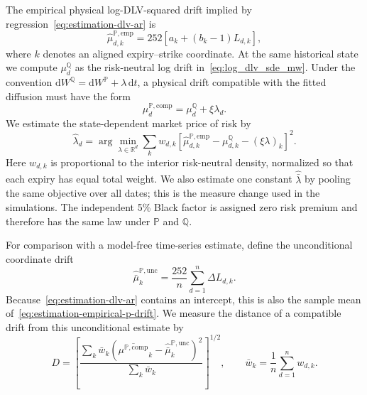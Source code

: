 \documentclass[smallextended,envcountsame,envcountsect]{svjour3}
\newcommand{\R}{\mathbb R}
\newcommand{\Q}{\mathbb Q}
\newcommand{\PP}{\mathbb P}
\newcommand{\dd}{\mathrm d}
\begin{document}
The empirical physical log-DLV-squared drift implied by
regression~\eqref{eq:estimation-dlv-ar} is
\begin{equation}
  \label{eq:estimation-empirical-p-drift}
  \widehat\mu_{d,k}^{\PP,\mathrm{emp}}
  =252\left[a_k+(b_k-1)L_{d,k}\right],
\end{equation}
where $k$ denotes an aligned expiry--strike coordinate.  At the same
historical state we compute $\mu_d^\Q$ as the risk-neutral log drift
in~\eqref{eq:log_dlv_sde_mw}.  Under the convention
$\dd W^\Q=\dd W^\PP+\lambda\,\dd t$, a physical drift compatible with the
fitted diffusion must have the form
\begin{equation}
  \label{eq:numerics-p-drift}
  \mu_d^{\PP,\mathrm{comp}}=\mu_d^\Q+\xi\lambda_d.
\end{equation}
We estimate the state-dependent market price of risk by
\begin{equation}
  \label{eq:numerics-statewise-lambda}
  \widehat\lambda_d
  =\arg\min_{\lambda\in\R^d}
    \sum_k w_{d,k}
    \left[
      \widehat\mu_{d,k}^{\PP,\mathrm{emp}}-\mu_{d,k}^{\Q}
      -(\xi\lambda)_k
    \right]^2.
\end{equation}
Here $w_{d,k}$ is proportional to the interior risk-neutral density, normalized
so that each expiry has equal total weight.  We also estimate one constant
$\widehat{\bar\lambda}$ by pooling the same objective over all dates; this is
the measure change used in the simulations.  The independent 5\% Black factor
is assigned zero risk premium and therefore has the same law under $\PP$ and
$\Q$.

For comparison with a model-free time-series estimate, define the
unconditional coordinate drift
\begin{equation}
  \label{eq:estimation-unconditional-p-drift}
  \widehat{\bar\mu}^{\PP,\mathrm{unc}}_k
  =\frac{252}{n}\sum_{d=1}^n\Delta L_{d,k}.
\end{equation}
Because~\eqref{eq:estimation-dlv-ar} contains an intercept, this is also the
sample mean of~\eqref{eq:estimation-empirical-p-drift}.  We measure the distance
of a compatible drift from this unconditional estimate by
\begin{equation}
  \label{eq:estimation-unconditional-drift-distance}
  D
  =\left[
    \frac{\sum_k\bar w_k
      \left(\overline{\mu^{\PP,\mathrm{comp}}}_k
      -\widehat{\bar\mu}^{\PP,\mathrm{unc}}_k\right)^2}
    {\sum_k\bar w_k}
  \right]^{1/2},
  \qquad
  \bar w_k=\frac1n\sum_{d=1}^n w_{d,k}.
\end{equation}
\end{document}
